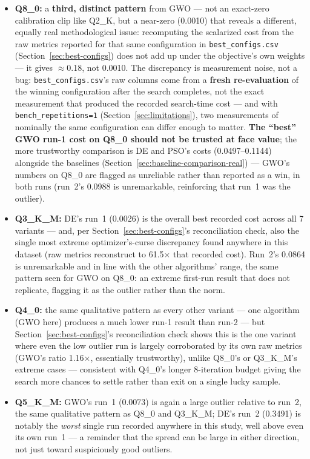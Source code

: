 \documentclass[journal]{IEEEtran}
\begin{document}
\begin{itemize}
  \item \textbf{Q8\_0:} a \textbf{third, distinct pattern} from GWO --- not an exact-zero calibration clip like Q2\_K, but a near-zero (0.0010) that reveals a different, equally real methodological issue: recomputing the scalarized cost from the raw metrics reported for that same configuration in \texttt{best\_configs.csv} (Section~\ref{sec:best-configs}) does not add up under the objective's own weights --- it gives $\approx$0.18, not 0.0010. The discrepancy is measurement noise, not a bug: \texttt{best\_configs.csv}'s raw columns come from a \textbf{fresh re-evaluation} of the winning configuration after the search completes, not the exact measurement that produced the recorded search-time cost --- and with \texttt{bench\_repetitions=1} (Section~\ref{sec:limitations}), two measurements of nominally the same configuration can differ enough to matter. \textbf{The ``best'' GWO run-1 cost on Q8\_0 should not be trusted at face value}; the more trustworthy comparison is DE and PSO's costs (0.0497--0.1144) alongside the baselines (Section~\ref{sec:baseline-comparison-real}) --- GWO's numbers on Q8\_0 are flagged as unreliable rather than reported as a win, in both runs (run~2's 0.0988 is unremarkable, reinforcing that run~1 was the outlier).
  \item \textbf{Q3\_K\_M:} DE's run~1 (0.0026) is the overall best recorded cost across all 7 variants --- and, per Section~\ref{sec:best-configs}'s reconciliation check, also the single most extreme optimizer's-curse discrepancy found anywhere in this dataset (raw metrics reconstruct to 61.5$\times$ that recorded cost). Run~2's 0.0864 is unremarkable and in line with the other algorithms' range, the same pattern seen for GWO on Q8\_0: an extreme first-run result that does not replicate, flagging it as the outlier rather than the norm.
  \item \textbf{Q4\_0:} the same qualitative pattern as every other variant --- one algorithm (GWO here) produces a much lower run-1 result than run-2 --- but Section~\ref{sec:best-configs}'s reconciliation check shows this is the one variant where even the low outlier run is largely corroborated by its own raw metrics (GWO's ratio 1.16$\times$, essentially trustworthy), unlike Q8\_0's or Q3\_K\_M's extreme cases --- consistent with Q4\_0's longer 8-iteration budget giving the search more chances to settle rather than exit on a single lucky sample.
  \item \textbf{Q5\_K\_M:} GWO's run~1 (0.0073) is again a large outlier relative to run~2, the same qualitative pattern as Q8\_0 and Q3\_K\_M; DE's run~2 (0.3491) is notably the \emph{worst} single run recorded anywhere in this study, well above even its own run~1 --- a reminder that the spread can be large in either direction, not just toward suspiciously good outliers.

\end{itemize}
\end{document}
